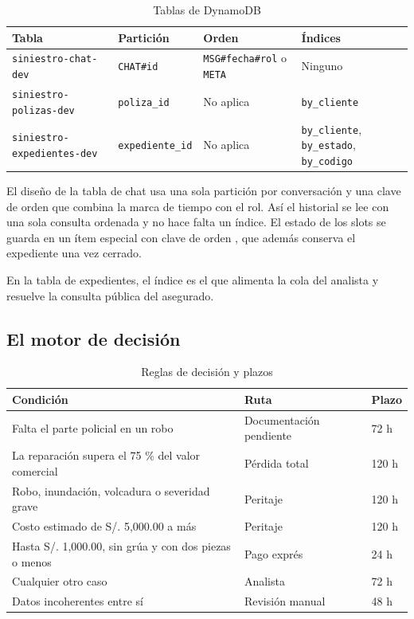 \documentclass[12pt,letterpaper]{article}
\newcommand{\code}[1]{\texttt{\detokenize{#1}}}
\begin{document}
\begin{table}[H]
\centering
\sloppy
\caption{Tablas de DynamoDB}
\label{tab:tablas}
\footnotesize
\begin{tabular}{>{\raggedright\arraybackslash}p{5.2cm}>{\raggedright\arraybackslash}p{2.2cm}>{\raggedright\arraybackslash}p{3.2cm}>{\raggedright\arraybackslash}p{3.1cm}}
\toprule
\textbf{Tabla} & \textbf{Partición} & \textbf{Orden} & \textbf{Índices} \\
\midrule
\texttt{siniestro-chat-dev} & \texttt{CHAT\#id} & \texttt{MSG\#fecha\#rol} o \texttt{META} & Ninguno \\
\addlinespace
\texttt{siniestro-polizas-dev} & \texttt{poliza\_id} & No aplica & \texttt{by\_cliente} \\
\addlinespace
\texttt{siniestro-expedientes-dev} & \texttt{expediente\_id} & No aplica & \texttt{by\_cliente}, \texttt{by\_estado}, \texttt{by\_codigo} \\
\bottomrule
\end{tabular}
\end{table}

El diseño de la tabla de chat usa una sola partición por conversación y una clave de
orden que combina la marca de tiempo con el rol. Así el historial se lee con una sola
consulta ordenada y no hace falta un índice. El estado de los slots se guarda en un ítem
especial con clave de orden \code{META}, que además conserva el expediente una vez
cerrado.

En la tabla de expedientes, el índice \code{by_estado} es el que alimenta la cola del
analista y \code{by_codigo} resuelve la consulta pública del asegurado.

\subsection{El motor de decisión}

\begin{table}[H]
\centering
\caption{Reglas de decisión y plazos}
\label{tab:reglas}
\small
\begin{tabular}{p{8.4cm}p{2.8cm}p{1.6cm}}
\toprule
\textbf{Condición} & \textbf{Ruta} & \textbf{Plazo} \\
\midrule
Falta el parte policial en un robo & Documentación pendiente & 72 h \\
La reparación supera el 75 \% del valor comercial & Pérdida total & 120 h \\
Robo, inundación, volcadura o severidad grave & Peritaje & 120 h \\
Costo estimado de S/. 5,000.00 a más & Peritaje & 120 h \\
Hasta S/. 1,000.00, sin grúa y con dos piezas o menos & Pago exprés & 24 h \\
Cualquier otro caso & Analista & 72 h \\
Datos incoherentes entre sí & Revisión manual & 48 h \\
\bottomrule
\end{tabular}
\end{table}
\end{document}
